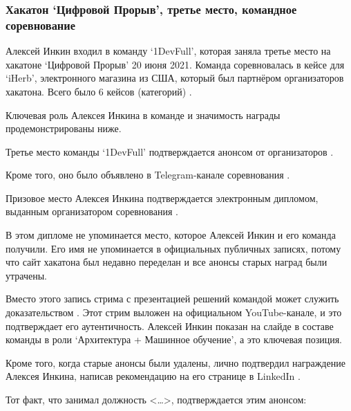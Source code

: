 \subsubsection{Хакатон `Цифровой Прорыв', третье место, командное соревнование}
\label{subsubsec:AwardLod}


Алексей Инкин входил в команду `1DevFull', которая заняла третье место на хакатоне `Цифровой Прорыв'
20 июня 2021.
Команда соревновалась в кейсе для `iHerb', электронного магазина из США,
который был партнёром организаторов хакатона.
Всего было 6 кейсов (категорий) .

Ключевая роль Алексея Инкина в команде и значимость награды продемонстрированы ниже.



Третье место команды `1DevFull' подтверждается анонсом от организаторов .

Кроме того, оно было объявлено в Telegram-канале соревнования .



Призовое место Алексея Инкина подтверждается электронным дипломом,
выданным организатором соревнования .

В этом дипломе не упоминается место, которое Алексей Инкин и его команда получили.
Его имя не упоминается в официальных публичных записях, потому что сайт хакатона
был недавно переделан и все анонсы старых наград были утрачены.

Вместо этого запись стрима с презентацией решений командой
может служить доказательством .
Этот стрим выложен на официальном YouTube-канале, и это подтверждает его аутентичность.
Алексей Инкин показан на слайде в составе команды в роли `Архитектура + Машинное обучение',
а это ключевая позиция.

Кроме того, когда старые анонсы были удалены,
\MrLod
лично подтвердил награждение Алексея Инкина, написав рекомендацию
на его странице в LinkedIn .

Тот факт, что \MrLod занимал должность <\dots>, подтверждается
этим анонсом:




